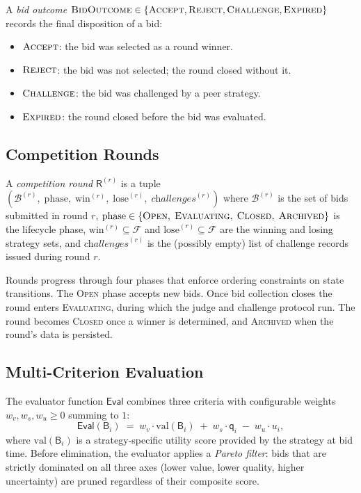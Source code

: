 \documentclass[11pt]{article}
\providecommand{\Fleet}{\mathcal{F}}              %
\providecommand{\Bid}{\mathsf{B}}                 %
\providecommand{\Round}{\mathsf{R}}               %
\providecommand{\Eval}{\mathsf{Eval}}             %
\providecommand{\tqual}{\mathsf{q}}               %
\providecommand{\BidSet}{\mathcal{B}}             %
\providecommand{\CompRound}{\textsc{CompRound}}   %
\providecommand{\BidOut}{\textsc{BidOutcome}}     %
\providecommand{\winner}{\mathrm{win}}            %
\providecommand{\loser}{\mathrm{lose}}            %
\providecommand{\ACCEPT}{\textsc{Accept}}
\providecommand{\REJECT}{\textsc{Reject}}
\begin{document}
\begin{definition}[\BidOut{}]\label{def:bidoutcome}
A \emph{bid outcome} $\BidOut \in \{\ACCEPT, \REJECT, \textsc{Challenge},
\textsc{Expired}\}$ records the final disposition of a bid:
\begin{itemize}
  \item $\ACCEPT$: the bid was selected as a round winner.
  \item $\REJECT$: the bid was not selected; the round closed without it.
  \item $\textsc{Challenge}$: the bid was challenged by a peer strategy.
  \item $\textsc{Expired}$: the round closed before the bid was evaluated.
\end{itemize}
\end{definition}

\subsection{Competition Rounds}

\begin{definition}[\CompRound{}]\label{def:compround}
A \emph{competition round} $\Round^{(r)}$ is a tuple $(\BidSet^{(r)},\;
\text{phase},\; \winner^{(r)},\; \loser^{(r)},\; \textit{challenges}^{(r)})$
where $\BidSet^{(r)}$ is the set of bids submitted in round $r$,
$\text{phase} \in \{\textsc{Open},\; \textsc{Evaluating},\;
\textsc{Closed},\; \textsc{Archived}\}$ is the lifecycle phase,
$\winner^{(r)} \subseteq \Fleet$ and $\loser^{(r)} \subseteq \Fleet$ are the
winning and losing strategy sets, and $\textit{challenges}^{(r)}$ is the
(possibly empty) list of challenge records issued during round $r$.
\end{definition}

Rounds progress through four phases that enforce ordering constraints on state
transitions.  The \textsc{Open} phase accepts new bids.  Once bid collection
closes the round enters \textsc{Evaluating}, during which the judge and
challenge protocol run.  The round becomes \textsc{Closed} once a winner is
determined, and \textsc{Archived} when the round's data is persisted.

\subsection{Multi-Criterion Evaluation}

The evaluator function $\Eval$ combines three criteria with configurable
weights $w_v, w_s, w_u \geq 0$ summing to $1$:
\[
  \Eval(\Bid_i) \;=\; w_v \cdot \text{val}(\Bid_i)
                  \;+\; w_s \cdot \tqual_i
                  \;-\; w_u \cdot u_i,
\]
where $\text{val}(\Bid_i)$ is a strategy-specific utility score provided by
the strategy at bid time.  Before elimination, the evaluator applies a
\emph{Pareto filter}: bids that are strictly dominated on all three axes
(lower value, lower quality, higher uncertainty) are pruned regardless of
their composite score.
\end{document}

